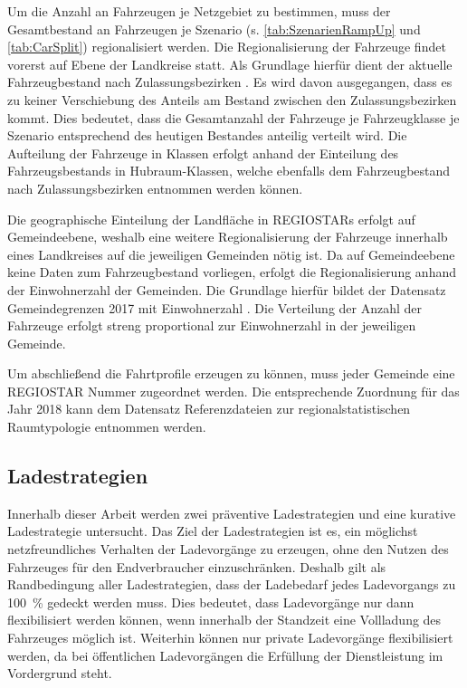 Um die Anzahl an Fahrzeugen je Netzgebiet zu bestimmen, muss der Gesamtbestand an Fahrzeugen je Szenario (s. \autoref{tab:SzenarienRampUp} und \autoref{tab:CarSplit}) regionalisiert werden.
Die Regionalisierung der Fahrzeuge findet vorerst auf Ebene der Landkreise statt.
Als Grundlage hierfür dient der aktuelle Fahrzeugbestand nach Zulassungsbezirken \cite[][Stand: ]{KBAPLZ2020}.
Es wird davon ausgegangen, dass es zu keiner Verschiebung des Anteils am Bestand zwischen den Zulassungsbezirken kommt.
Dies bedeutet, dass die Gesamtanzahl der Fahrzeuge je Fahrzeugklasse je Szenario entsprechend des heutigen Bestandes anteilig verteilt wird.
Die Aufteilung der Fahrzeuge in Klassen erfolgt anhand der Einteilung des Fahrzeugsbestands in Hubraum-Klassen, welche ebenfalls dem Fahrzeugbestand nach Zulassungsbezirken entnommen werden können.\medskip

Die geographische Einteilung der Landfläche in \glspl{REGIOSTAR} erfolgt auf Gemeindeebene, weshalb eine weitere Regionalisierung der Fahrzeuge innerhalb eines Landkreises auf die jeweiligen Gemeinden nötig ist.
Da auf Gemeindeebene keine Daten zum Fahrzeugbestand vorliegen, erfolgt die Regionalisierung anhand der Einwohnerzahl der Gemeinden.
Die Grundlage hierfür bildet der Datensatz \glqq Gemeindegrenzen 2017 mit Einwohnerzahl\grqq{} \cite[][Stand: ]{EDG2020}.
Die Verteilung der Anzahl der Fahrzeuge erfolgt streng proportional zur Einwohnerzahl in der jeweiligen Gemeinde.\medskip

Um abschließend die Fahrtprofile erzeugen zu können, muss jeder Gemeinde eine \gls{REGIOSTAR} Nummer zugeordnet werden.
Die entsprechende Zuordnung für das Jahr \num{2018} kann dem Datensatz \glqq Referenzdateien zur regionalstatistischen Raumtypologie\grqq{} \cite[][Stand: ]{BMVIa2020} entnommen werden.


\subsection{Ladestrategien}

Innerhalb dieser Arbeit werden zwei präventive Ladestrategien und eine kurative Ladestrategie untersucht.
Das Ziel der Ladestrategien ist es, ein möglichst netzfreundliches Verhalten der Ladevorgänge zu erzeugen, ohne den Nutzen des Fahrzeuges für den Endverbraucher einzuschränken.
Deshalb gilt als Randbedingung aller Ladestrategien, dass der Ladebedarf jedes Ladevorgangs zu \SI{100}{\percent} gedeckt werden muss.
Dies bedeutet, dass Ladevorgänge nur dann flexibilisiert werden können, wenn innerhalb der Standzeit eine Vollladung des Fahrzeuges möglich ist.
Weiterhin können nur private Ladevorgänge flexibilisiert werden, da bei öffentlichen Ladevorgängen die Erfüllung der Dienstleistung im Vordergrund steht.\medskip

